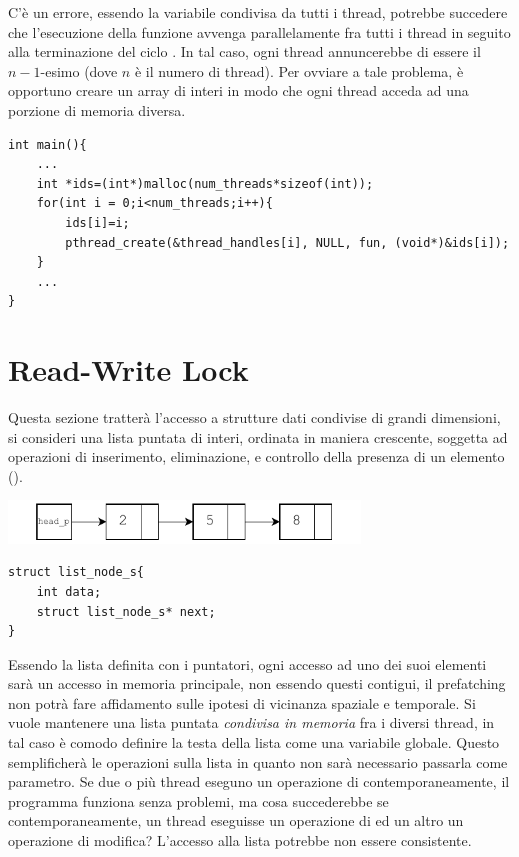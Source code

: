 \documentclass[10pt, letterpaper]{report}
\begin{document}
C'è un errore, essendo la variabile  condivisa da tutti i thread, potrebbe succedere che l'esecuzione della funzione  avvenga parallelamente fra tutti i thread in seguito alla terminazione del ciclo . In tal caso, ogni thread annuncerebbe di essere il $n-1$-esimo (dove $n$ è il numero di thread). \acc 
Per ovviare a tale problema, è opportuno creare un array di interi in modo che ogni thread acceda ad una porzione di memoria diversa.
\begin{lstlisting}[style=CStyle]
int main(){
    ... 
    int *ids=(int*)malloc(num_threads*sizeof(int));
    for(int i = 0;i<num_threads;i++){
        ids[i]=i;
        pthread_create(&thread_handles[i], NULL, fun, (void*)&ids[i]);
    }
    ...
}
    \end{lstlisting}
    \flowerLine 
\section{Read-Write Lock}
Questa sezione tratterà l'accesso a strutture dati condivise di grandi dimensioni, si consideri una lista puntata di interi, ordinata in maniera crescente, soggetta ad operazioni di inserimento, eliminazione, e controllo della presenza di un elemento ().\begin{center}
    \includegraphics[width=0.7\textwidth]{images/lista.pdf}
\end{center}
\begin{lstlisting}[style=CStyle]
struct list_node_s{
    int data;
    struct list_node_s* next;
}
\end{lstlisting}
Essendo la lista definita con i puntatori, ogni accesso ad uno dei suoi elementi sarà un accesso in memoria principale, non essendo questi contigui, il prefatching non potrà fare affidamento sulle ipotesi di vicinanza spaziale e temporale.\acc 
Si vuole mantenere una lista puntata \textit{condivisa in memoria} fra i diversi thread, in tal caso è comodo definire la testa della lista  come una variabile globale. Questo semplificherà le operazioni sulla lista in quanto non sarà necessario passarla come parametro.\acc 
Se due o più thread eseguno un operazione di  contemporaneamente, il programma funziona senza problemi, ma cosa succederebbe se contemporaneamente, un thread eseguisse un operazione di   ed un altro un operazione di modifica? L'accesso alla lista potrebbe non essere consistente.
\end{document}
